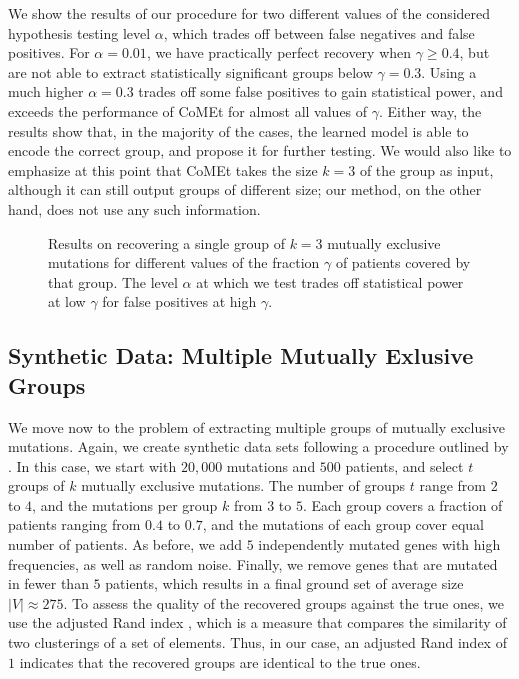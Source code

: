 We show the results of our procedure for two different values of the considered hypothesis testing level $\alpha$, which trades off between false negatives and false positives.
For $\alpha = 0.01$, we have practically perfect recovery when $\gamma \geq 0.4$, but are not able to extract statistically significant groups below $\gamma = 0.3$. 
Using a much higher $\alpha = 0.3$ trades off some false positives to gain statistical power, and exceeds the performance of CoMEt for almost all values of $\gamma$.
Either way, the results show that, in the majority of the cases, the learned \fldc{} model is able to encode the correct group, and propose it for further testing.
We would also like to emphasize at this point that CoMEt takes the size $k = 3$ of the group as input, although it can still output groups of different size; our method, on the other hand, does not use any such information.

\setlength{}
\setlength{}
\begin{figure}[htb]
  \centering
  
  \caption{Results on recovering a single group of $k = 3$ mutually exclusive mutations for different values of the fraction $\gamma$ of patients covered by that group.
  The level $\alpha$ at which we test trades off statistical power at low $\gamma$ for false positives at high $\gamma$.
  }
  \label{fig:syn_single}
\end{figure}

\subsection{Synthetic Data: Multiple Mutually Exlusive Groups}
We move now to the problem of extracting multiple groups of mutually exclusive mutations.
Again, we create synthetic data sets following a procedure outlined by \cite{comet}.
In this case, we start with $20,000$ mutations and $500$ patients, and select $t$ groups of $k$ mutually exclusive mutations.
The number of groups $t$ range from $2$ to $4$, and the mutations per group $k$ from $3$ to $5$.
Each group covers a fraction of patients ranging from $0.4$ to $0.7$, and the mutations of each group cover equal number of patients.
As before, we add $5$ independently mutated genes with high frequencies, as well as random noise.
Finally, we remove genes that are mutated in fewer than $5$ patients, which results in a final ground set of average size $|V| \approx 275$.
To assess the quality of the recovered groups against the true ones, we use the adjusted Rand index \citep{ari}, which is a measure that compares the similarity of two clusterings of a set of elements.
Thus, in our case, an adjusted Rand index of $1$ indicates that the recovered groups are identical to the true ones.

